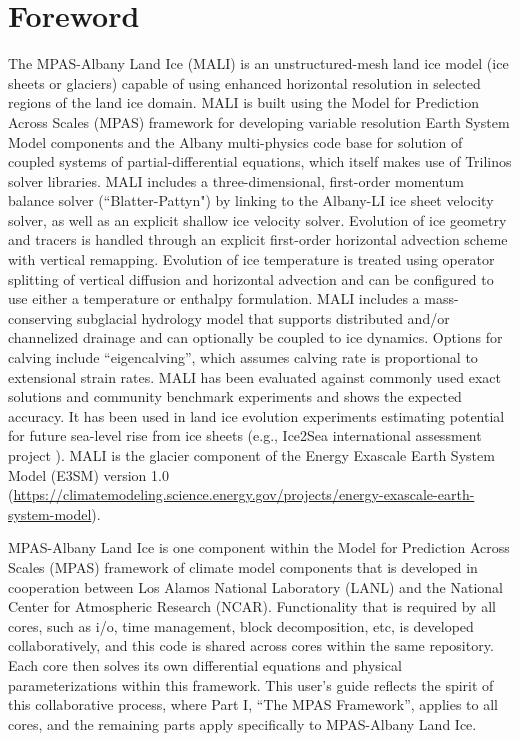 \chapter*{Foreword}
\label{chap:foreword}

The MPAS-Albany Land Ice (MALI) is an unstructured-mesh land ice model (ice sheets or glaciers) capable of using enhanced 
horizontal resolution in selected regions of the land ice domain.  
MALI is built using the Model for Prediction Across Scales (MPAS) framework for developing variable resolution Earth System Model components 
and the Albany multi-physics code base for solution of coupled systems of partial-differential equations, which itself makes use of Trilinos solver libraries.  
MALI includes a three-dimensional, first-order momentum balance solver (``Blatter-Pattyn") by linking to the Albany-LI ice sheet velocity solver,
as well as an explicit shallow ice velocity solver.
Evolution of ice geometry and tracers is handled through an explicit first-order
horizontal advection scheme with vertical remapping.
Evolution of ice temperature is treated using operator splitting of vertical diffusion and horizontal advection and can be configured to use either a temperature or enthalpy formulation.  
MALI includes a mass-conserving subglacial hydrology model that supports distributed and/or channelized drainage and can optionally be coupled to ice dynamics.
Options for calving include ``eigencalving'', which assumes calving rate is proportional to extensional strain rates.
MALI has been evaluated against commonly used exact solutions and community benchmark experiments and shows the expected accuracy.
It has been used in land ice evolution experiments estimating potential for future sea-level rise from ice sheets 
(e.g., Ice2Sea international assessment project \citep{Shannon2013, edwards2014}).  
MALI is the glacier component of the Energy Exascale Earth System Model (E3SM) version 1.0
(\url{https://climatemodeling.science.energy.gov/projects/energy-exascale-earth-system-model}).

MPAS-Albany Land Ice is one component within the Model for Prediction Across Scales (MPAS) framework of climate model components
 that is developed in cooperation between Los Alamos National Laboratory (LANL) and the National Center for Atmospheric Research (NCAR).  
Functionality that is required by all cores, such as i/o, time management, block decomposition, etc, is developed collaboratively, and this code is shared across cores within the same repository.  
Each core then solves its own differential equations and physical parameterizations within this framework.  
This user's guide reflects the spirit of this collaborative process, where Part I, ``The MPAS Framework'', applies to all cores, 
and the remaining parts apply specifically to MPAS-Albany Land Ice.

